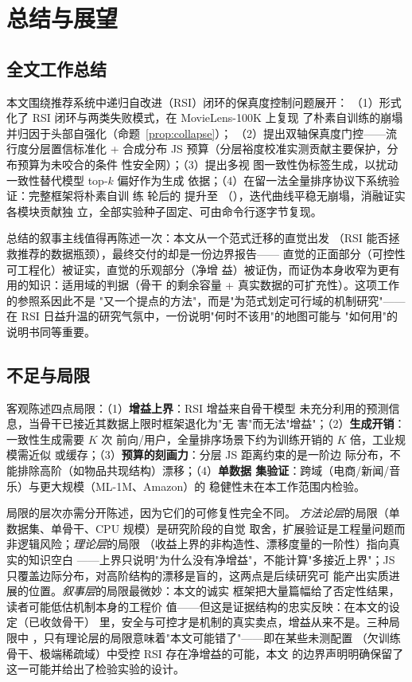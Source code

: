 \chapter{总结与展望}

\section{全文工作总结}
本文围绕推荐系统中递归自改进（RSI）闭环的保真度控制问题展开：
（1）形式化了 RSI 闭环与两类失败模式，在 MovieLens-100K 上复现
了朴素自训练的崩塌并归因于头部自强化（命题~\ref{prop:collapse}）；
（2）提出双轴保真度门控——流行度分层置信标准化 + 合成分布 JS
预算（分层裕度校准实测贡献主要保护，分布预算为未咬合的条件
性安全网）；（3）提出多视
图一致性伪标签生成，以扰动一致性替代模型 top-$k$ 偏好作为生成
依据；（4）在留一法全量排序协议下系统验证：完整框架将朴素自训
练 \ExpRounds{} 轮后的 \ExpNaiveEnd{} 提升至 \ExpOursEnd{}
（\ExpGainText{}），迭代曲线平稳无崩塌，消融证实各模块贡献独
立，全部实验种子固定、可由命令行逐字节复现。

总结的叙事主线值得再陈述一次：本文从一个范式迁移的直觉出发
（RSI 能否拯救推荐的数据瓶颈），最终交付的却是一份边界报告——
直觉的正面部分（可控性可工程化）被证实，直觉的乐观部分（净增
益）被证伪，而证伪本身收窄为更有用的知识：适用域的判据（骨干
的剩余容量 + 真实数据的可扩充性）。这项工作的参照系因此不是
"又一个提点的方法"，而是"为范式划定可行域的机制研究"——在
RSI 日益升温的研究气氛中，一份说明"何时不该用"的地图可能与
"如何用"的说明书同等重要。

\section{不足与局限}
客观陈述四点局限：（1）\textbf{增益上界}：RSI 增益来自骨干模型
未充分利用的预测信息，当骨干已接近其数据上限时框架退化为"无
害"而无法"增益"；（2）\textbf{生成开销}：一致性生成需要 $K$ 次
前向/用户，全量排序场景下约为训练开销的 $K$ 倍，工业规模需近似
或缓存；（3）\textbf{预算的刻画力}：分层 JS 距离约束的是一阶边
际分布，不能排除高阶（如物品共现结构）漂移；（4）\textbf{单数据
集验证}：跨域（电商/新闻/音乐）与更大规模（ML-1M、Amazon）的
稳健性未在本工作范围内检验。

局限的层次亦需分开陈述，因为它们的可修复性完全不同。\emph{
方法论层}的局限（单数据集、单骨干、CPU 规模）是研究阶段的自觉
取舍，扩展验证是工程量问题而非逻辑风险；\emph{理论层}的局限
（收益上界的非构造性、漂移度量的一阶性）指向真实的知识空白
——上界只说明"为什么没有净增益"，不能计算"多接近上界"；JS
只覆盖边际分布，对高阶结构的漂移是盲的，这两点是后续研究可
能产出实质进展的位置。\emph{叙事层}的局限最微妙：本文的诚实
框架把大量篇幅给了否定性结果，读者可能低估机制本身的工程价
值——但这是证据结构的忠实反映：在本文的设定（已收敛骨干）
里，安全与可控才是机制的真实卖点，增益从来不是。三种局限中
，只有理论层的局限意味着"本文可能错了"——即在某些未测配置
（欠训练骨干、极端稀疏域）中受控 RSI 存在净增益的可能，本文
的边界声明明确保留了这一可能并给出了检验实验的设计。

